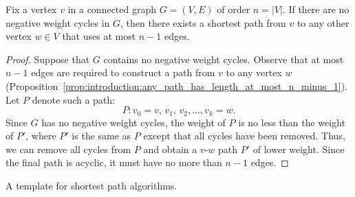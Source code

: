 \begin{lemma}
\label{lem:graph_algorithms:shortest_path_length}
Fix a vertex $v$ in a connected graph $G = (V,E)$ of order
$n = |V|$. If there are no negative weight
cycles in $G$, then there exists a shortest
path from $v$ to any other vertex $w \in V$ that
uses at most $n - 1$ edges.
\end{lemma}

\begin{proof}
Suppose that $G$ contains no negative weight cycles. Observe that at
most $n - 1$ edges are required to construct a path from $v$ to any
vertex $w$
(Proposition~\ref{prop:introduction:any_path_has_length_at_most_n_minus_1}).
Let $P$ denote such a path:
\[
P: v_0 = v,\, v_1,\, v_2, \dots, v_k = w.
\]
Since $G$ has no negative weight cycles, the
weight of $P$ is no less than the weight of $P'$, where $P'$ is the
same as $P$ except that all cycles have been removed. Thus, we can
remove all cycles from $P$ and obtain a $v$-$w$ path $P'$
of lower weight. Since the final path is acyclic, it must have no more
than $n - 1$ edges.
\end{proof}

\begin{algorithm}[!htbp]

\caption{A template for shortest path algorithms.}
\label{alg:graph_algorithms:generic_shortest_path_algorithm}
\end{algorithm}

